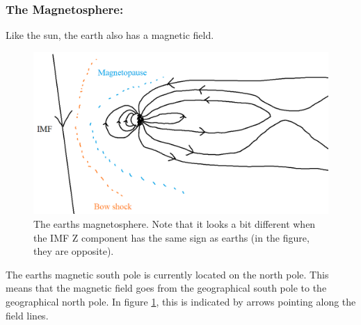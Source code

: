 \documentclass[norsk,a4paper,12pt]{article}
\begin{document}
\newpage
	\subsubsection{The Magnetosphere:}
		Like the sun, the earth also has a magnetic field.
		\begin{figure}[H]
			\includegraphics[scale = 0.5]{Figures/magnetosphere.png}
			\centering
			\caption{The earths magnetosphere. Note that it looks a bit different when the IMF Z component has the same sign as earths (in the figure, they 						     are opposite).}
			\label{fig::magnetopause}
		\end{figure}
	
	The earths magnetic south pole is currently located on the north pole. This means that the magnetic field goes from the geographical south pole to the 			geographical north pole. In figure \ref{fig::magnetopause}, this is indicated by arrows pointing along the field lines.
\end{document}

